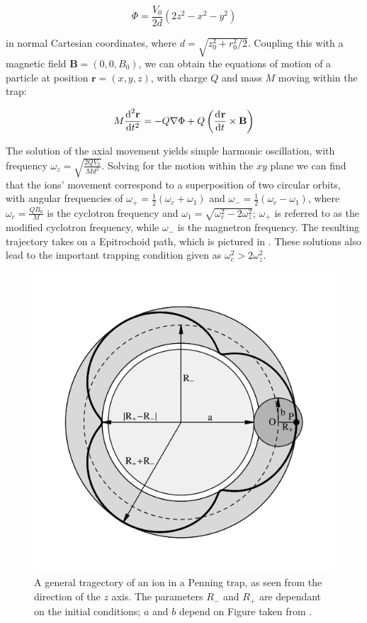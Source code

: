 \documentclass[12pt,twoside]{article}
\begin{document}
\begin{equation}
	\Phi = \frac{V_0}{2d}\left(2z^2-x^2-y^2\right)
\label{Eq:Penning_EPot}
\end{equation}

in normal Cartesian coordinates, where $d = \sqrt{z_0^2 + r_0^2/2}$. Coupling this with a magnetic field $\mathbf{B} = \left(0,0,B_0\right)$, we can obtain the equations of motion of a particle at position $\mathbf{r} = \left(x,y,z\right)$, with charge $Q$ and mass $M$ moving within the trap\cite{Charged_Particle_traps_Penning}:

\begin{equation}
	M\der[2]{\mathbf{r}}{t} = -Q\mathbf{\nabla}\Phi + Q\left(\der{\mathbf{r}}{t}\times \mathbf{B} \right)
	\label{Eq:Penning_mov}
\end{equation}

The solution of the axial movement yields simple harmonic oscillation, with frequency $\omega_z = \sqrt{\frac{2QV_0}{Md^2}}$. Solving for the motion within the $xy$ plane we can find that the ions' movement correspond to a superposition of two circular orbits, with angular frequencies of $\omega_+ = \frac{1}{2}\left(\omega_c + \omega_1\right)$ and $\omega_- = \frac{1}{2}\left(\omega_c - \omega_1\right)$, where $\omega_c = \frac{QB_0}{M}$ is the cyclotron frequency and $\omega_1 = \sqrt{\omega_c^2 - 2\omega_z^2}$; $\omega_+$ is referred to as the modified cyclotron frequency, while $\omega_-$ is the magnetron frequency. The resulting trajectory takes on a Epitrochoid path\cite{Charged_Particle_traps_Penning,Sideband_cooling_penning_trap,Thompson_Coulomb_Crystals}, which is pictured in . These solutions also lead to the important trapping condition given as $\omega_c^2 > 2\omega_z^2$\cite{Charged_Particle_traps_Penning}.

\begin{figure}[t!]
	\centering
	\includegraphics[width=0.5\linewidth]{Penning_trap_movement_general}
	\caption[Radial movement in Penning trap]{A general tragectory of an ion in a Penning trap, as seen from the direction of the $z$ axis. The parameters $R_-$ and $R_+$ are dependant on the initial conditions; $a$ and $b$ depend on  Figure taken from \cite{Charged_Particle_traps_Penning}.}
	\label{Fig:Penning_movement}
\end{figure}
\end{document}
